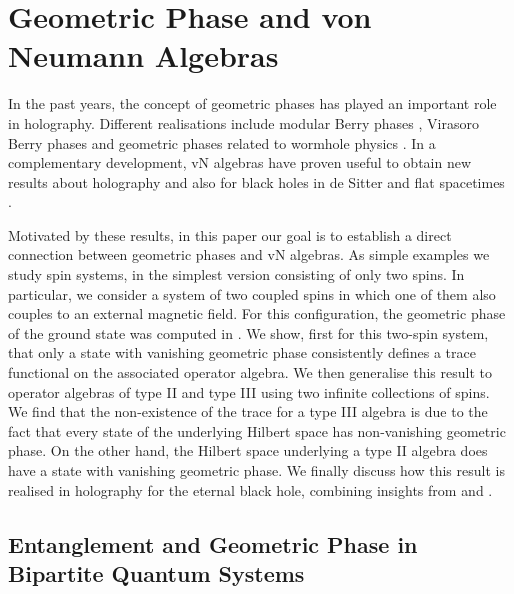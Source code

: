 \documentclass[a4paper,11pt]{article}
\newcommand{\1}{\mathds{1}}
\begin{document}
\section{Geometric Phase and von Neumann Algebras}
\label{sec:GeomPhaseAndTrace}

In the past years, the concept of geometric phases has played an important role in holography. Different realisations include  modular Berry phases \cite{Czech:2017zfq,Czech:2018kvg,Czech:2019vih,deBoer:2021zlm,Czech:2023zmq}, Virasoro Berry phases \cite{Oblak:2017ect} and geometric phases related to wormhole physics \cite{Nogueira:2021ngh,Banerjee:2022jnv}. In a complementary development, vN algebras have proven useful to obtain new results about holography \cite{Jefferson:2018ksk,Leutheusser:2021frk,Leutheusser:2021qhd,Witten:2021unn} and also for black holes in de Sitter and flat spacetimes \cite{Chandrasekaran:2022cip,Chandrasekaran:2022eqq}.

Motivated by these results, in this paper our goal is to establish a direct connection between geometric phases and vN algebras. As simple examples we study spin systems, in the simplest version consisting of only two spins. In particular, we consider a system of two coupled spins in which one of them also couples to an external magnetic field. For this configuration, the geometric phase of the ground state  was computed in \cite{Nogueira:2021ngh}. We show, first for this two-spin system, that only a state with vanishing geometric phase consistently defines a trace functional on the associated operator algebra. We then generalise this result to operator algebras of type II and type III using two infinite collections of spins. We find that the non-existence of the trace for a type III algebra is due to the fact that every state of the underlying Hilbert space has non-vanishing geometric phase. On the other hand, the Hilbert space underlying a type II algebra does have a state with vanishing geometric phase. We finally discuss how this result is realised in holography for the eternal black hole, combining insights from \cite{Witten:2021unn} and \cite{Nogueira:2021ngh}.

\subsection{Entanglement and Geometric Phase in Bipartite Quantum Systems}
\label{sec:BipartiteQuantumSystems}
\end{document}
